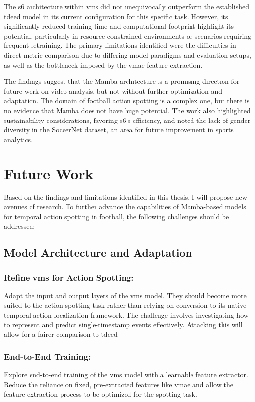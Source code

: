 The \acrshort{s6} architecture within \acrshort{vms} did not unequivocally outperform the established \acrshort{tdeed} model in its current configuration for this specific task. However, its significantly reduced training time and computational footprint highlight its potential, particularly in resource-constrained environments or scenarios requiring frequent retraining. The primary limitations identified were the difficulties in direct metric comparison due to differing model paradigms and evaluation setups, as well as the bottleneck imposed by the \acrshort{vmae} feature extraction.

The findings suggest that the Mamba architecture is a promising direction for future work on video analysis, but not without further optimization and adaptation. The domain of football action spotting is a complex one, but there is no evidence that Mamba does not have huge potential. The work also highlighted sustainability considerations, favoring \acrshort{s6}'s efficiency, and noted the lack of gender diversity in the SoccerNet dataset, an area for future improvement in sports analytics.


\section{Future Work}
\label{sec:future_work}
Based on the findings and limitations identified in this thesis, I will propose new avenues of research. To further advance the capabilities of Mamba-based models for temporal action spotting in football, the following challenges should be addressed:

\subsection{Model Architecture and Adaptation}

\subsubsection{Refine \acrshort{vms} for Action Spotting:} 
Adapt the input and output layers of the \acrshort{vms} model. They should become more suited to the action spotting task rather than relying on conversion to its native temporal action localization framework. The challenge involves investigating how to represent and predict single-timestamp events effectively. Attacking this will allow for a fairer comparison to \acrshort{tdeed}

\subsubsection{End-to-End Training:} 
Explore end-to-end training of the \acrshort{vms} model with a learnable feature extractor. Reduce the reliance on fixed, pre-extracted features like \acrshort{vmae} and allow the feature extraction process to be optimized for the spotting task.

